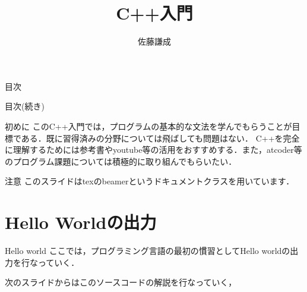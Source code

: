 
\title{C++入門}
\author{佐藤謙成}


\begin{frame}
    \titlepage
\end{frame}

\begin{frame}{目次}
  \tableofcontents[sections={1-6}]
\end{frame}

\begin{frame}{目次(続き)}
    \tableofcontents[sections={7-12}]
\end{frame}

\begin{frame}{初めに}
    このC++入門では，プログラムの基本的な文法を学んでもらうことが目標である．既に習得済みの分野については飛ばしても問題はない．
    C++を完全に理解するためには参考書やyoutube等の活用をおすすめする．また，atcoder等のプログラム課題については積極的に取り組んでもらいたい．
\end{frame}

\begin{frame}{注意}
    このスライドはtexのbeamerというドキュメントクラスを用いています．
\end{frame}
\section{Hello Worldの出力}

\begin{frame}[fragile]{Hello world}
ここでは，プログラミング言語の最初の慣習としてHello worldの出力を行なっていく．
    
次のスライドからはこのソースコードの解説を行なっていく，
\end{frame}

